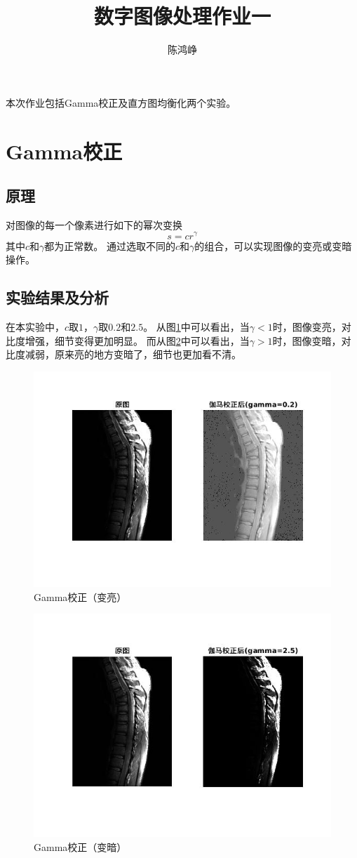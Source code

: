 \documentclass[logo,reportComp]{thesis}
\title{数字图像处理作业一}
\subtitle{}
\author{陈鸿峥}
\begin{document}
\maketitle

本次作业包括Gamma校正及直方图均衡化两个实验。

\section{Gamma校正}
\subsection{原理}
对图像的每一个像素进行如下的幂次变换
\[s=cr^\gamma\]
其中$c$和$\gamma$都为正常数。
通过选取不同的$c$和$\gamma$的组合，可以实现图像的变亮或变暗操作。

\subsection{实验结果及分析}
在本实验中，$c$取$1$，$\gamma$取$0.2$和$2.5$。
从图\ref{fig:gamma0.2}中可以看出，当$\gamma<1$时，图像变亮，对比度增强，细节变得更加明显。
而从图\ref{fig:gamma2.5}中可以看出，当$\gamma>1$时，图像变暗，对比度减弱，原来亮的地方变暗了，细节也更加看不清。
\begin{figure}[H]
\centering
\includegraphics[width=0.8\linewidth,trim=50 80 50 50,clip]{fig/gamma02.jpg}
\caption{Gamma校正（变亮）}
\label{fig:gamma0.2}
\end{figure}
\begin{figure}[H]
\centering
\includegraphics[width=0.8\linewidth,trim=50 80 50 50,clip]{fig/gamma25.jpg}
\caption{Gamma校正（变暗）}
\label{fig:gamma2.5}
\end{figure}
\end{document}
